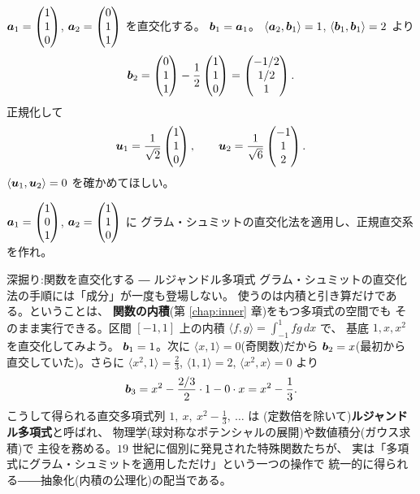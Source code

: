 \begin{rei}\label{rei:gs-worked}
$\bm{a}_1 = \begin{pmatrix}1 \\ 1 \\ 0\end{pmatrix}$, $\bm{a}_2 = \begin{pmatrix}0 \\ 1 \\ 1\end{pmatrix}$ を直交化する。
$\bm{b}_1 = \bm{a}_1$。
$\langle \bm{a}_2, \bm{b}_1 \rangle = 1$,
$\langle \bm{b}_1, \bm{b}_1 \rangle = 2$ より
\[
\bm{b}_2 = \begin{pmatrix}0 \\ 1 \\ 1\end{pmatrix} - \frac{1}{2}\begin{pmatrix}1 \\ 1 \\ 0\end{pmatrix}
= \begin{pmatrix}-1/2 \\ 1/2 \\ 1\end{pmatrix}.
\]
正規化して
\[
\bm{u}_1 = \frac{1}{\sqrt{2}}\begin{pmatrix}1 \\ 1 \\ 0\end{pmatrix}, \qquad
\bm{u}_2 = \frac{1}{\sqrt{6}}\begin{pmatrix}-1 \\ 1 \\ 2\end{pmatrix}.
\]
$\langle \bm{u}_1, \bm{u}_2 \rangle = 0$ を確かめてほしい。
\end{rei}

\begin{mondai}\label{q:gs}
$\bm{a}_1 = \begin{pmatrix}1 \\ 0 \\ 1\end{pmatrix}$, $\bm{a}_2 = \begin{pmatrix}1 \\ 1 \\ 0\end{pmatrix}$ に
グラム・シュミットの直交化法を適用し、正規直交系を作れ。
\end{mondai}

\begin{itembox}[l]{深掘り:関数を直交化する ― ルジャンドル多項式}
グラム・シュミットの直交化法の手順には「成分」が一度も登場しない。
使うのは内積と引き算だけである。ということは、
\textbf{関数の内積}(第 \ref{chap:inner} 章)をもつ多項式の空間でも
そのまま実行できる。区間 $[-1, 1]$ 上の内積
$\langle f, g \rangle = \int_{-1}^{1} f g\,dx$ で、
基底 $1, x, x^2$ を直交化してみよう。
$\bm{b}_1 = 1$。次に $\langle x, 1 \rangle = 0$(奇関数)だから
$\bm{b}_2 = x$(最初から直交していた)。さらに
$\langle x^2, 1 \rangle = \frac{2}{3}$, $\langle 1, 1 \rangle = 2$,
$\langle x^2, x \rangle = 0$ より
\[
\bm{b}_3 = x^2 - \frac{2/3}{2} \cdot 1 - 0 \cdot x = x^2 - \frac{1}{3}.
\]
こうして得られる直交多項式列 $1,\ x,\ x^2 - \frac{1}{3},\ \dots$ は
(定数倍を除いて)\textbf{ルジャンドル多項式}と呼ばれ、
物理学(球対称なポテンシャルの展開)や数値積分(ガウス求積)で
主役を務める。$19$ 世紀に個別に発見された特殊関数たちが、
実は「多項式にグラム・シュミットを適用しただけ」という一つの操作で
統一的に得られる――抽象化(内積の公理化)の配当である。
\end{itembox}

